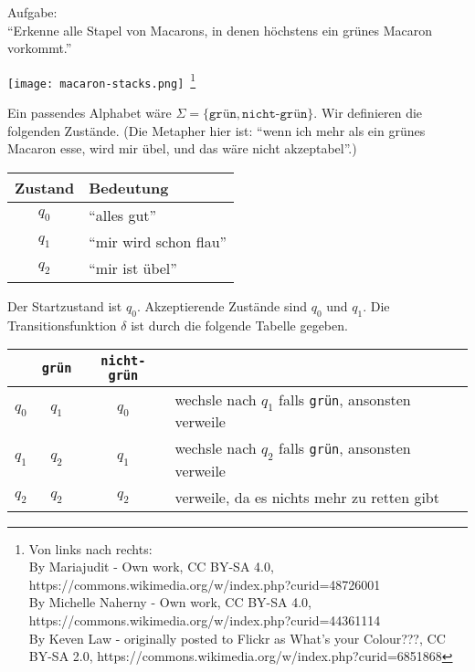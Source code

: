 \begin{Bsp}Aufgabe: 
  \\
  \label{Bsp:3.1}
  "`Erkenne alle Stapel von Macarons, in denen höchstens ein grünes Macaron vorkommt."'
\begin{center}
  \texttt{[image: macaron-stacks.png]}~\footnote{
  \tiny Von links nach rechts: \\
By Mariajudit - Own work, CC BY-SA 4.0, https://commons.wikimedia.org/w/index.php?curid=48726001
  \\
By Michelle Naherny - Own work, CC BY-SA 4.0, https://commons.wikimedia.org/w/index.php?curid=44361114
  \\
By Keven Law - originally posted to Flickr as What's your Colour???, CC BY-SA 2.0, https://commons.wikimedia.org/w/index.php?curid=6851868
}

\end{center}
Ein passendes Alphabet wäre $\Sigma = \{\texttt{grün} , \texttt{nicht-grün} \}$.
Wir definieren die folgenden Zustände.
(Die Metapher hier ist: "`wenn ich mehr als ein grünes Macaron esse, wird mir übel, und das wäre nicht akzeptabel"'.)
\begin{center}
\begin{tabular}{cl}
  Zustand & Bedeutung \\
  \hline
  $q_0$& "`alles gut"' \\
  $q_1$& "`mir wird schon flau"' \\
  $q_2$& "`mir ist übel"'
\end{tabular}
\end{center}
Der Startzustand ist $q_0$.
Akzeptierende Zustände sind $q_0$ und $q_1$.
Die Transitionsfunktion $\delta$ ist durch die folgende Tabelle gegeben.
\begin{center}
\begin{tabular}{cccl}
  &\texttt{grün} & \texttt{nicht-grün} \\
  \hline
  $q_0$ & $q_1$ & $q_0$ & wechsle nach $q_1$ falls \texttt{grün}, ansonsten verweile \\
  $q_1$ & $q_2$ & $q_1$ & wechsle nach $q_2$ falls \texttt{grün}, ansonsten verweile \\
  $q_2$  & $q_2$ & $q_2$ & verweile, da es nichts mehr zu retten gibt
\qedhere
\end{tabular}
\end{center}
\end{Bsp}

